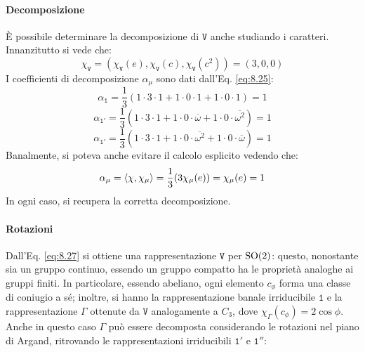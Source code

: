 \paragraph{Decomposizione}

È possibile determinare la decomposizione di $ \mathtt{V} $ anche studiando i caratteri. Innanzitutto si vede che:
\begin{equation*}
	\chi_{\mathtt{V}} = (\chi_{\mathtt{V}}(e), \chi_{\mathtt{V}}(c), \chi_{\mathtt{V}}(c^2)) = (3,0,0)
\end{equation*}
I coefficienti di decomposizione $ \alpha_{\mu} $ sono dati dall'Eq. \ref{eq:8.25}:
\begin{equation*}
	\alpha_{\mathtt{1}} = \frac{1}{3} (1 \cdot 3 \cdot 1 + 1 \cdot 0 \cdot 1 + 1 \cdot 0 \cdot 1) = 1
\end{equation*}
\begin{equation*}
	\alpha_{\mathtt{1}'} = \frac{1}{3} (1 \cdot 3 \cdot 1 + 1 \cdot 0 \cdot \overline{\omega} + 1 \cdot 0 \cdot \overline{\omega^2}) = 1
\end{equation*}
\begin{equation*}
	\alpha_{\mathtt{1}'} = \frac{1}{3} (1 \cdot 3 \cdot 1 + 1 \cdot 0 \cdot \overline{\omega^2} + 1 \cdot 0 \cdot \overline{\omega}) = 1
\end{equation*}
Banalmente, si poteva anche evitare il calcolo esplicito vedendo che:
\begin{equation*}
	\alpha_{\mu} = \braket{\chi,\chi_{\mu}} = \frac{1}{3} (3 \chi_{\mu}(e)) = \chi_{\mu}(e) = 1
\end{equation*}
In ogni caso, si recupera la corretta decomposizione.

\paragraph{Rotazioni}

Dall'Eq. \ref{eq:8.27} si ottiene una rappresentazione $ \mathtt{V} $ per $ \mathrm{SO}(2) $: questo, nonostante sia un gruppo continuo, essendo un gruppo compatto ha le proprietà analoghe ai gruppi finiti. In particolare, essendo abeliano, ogni elemento $ c_{\phi} $ forma una classe di coniugio a sé; inoltre, si hanno la rappresentazione banale irriducibile $ \mathtt{1} $ e la rappresentazione $ \Gamma $ ottenute da $ \mathtt{V} $ analogamente a $ C_3 $, dove $ \chi_{\Gamma}(c_{\phi}) = 2\cos \phi $. Anche in questo caso $ \Gamma $ può essere decomposta considerando le rotazioni nel piano di Argand, ritrovando le rappresentazioni irriducibili $ \mathtt{1}' $ e $ \mathtt{1}'' $:

